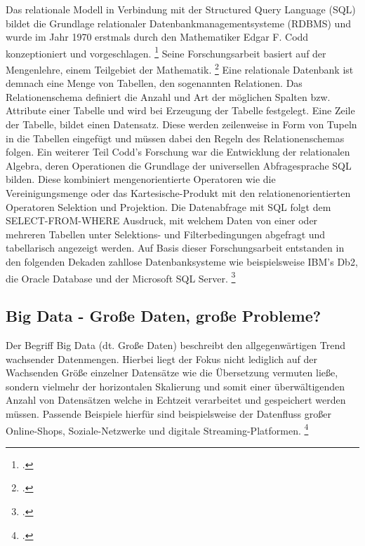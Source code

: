 Das relationale Modell in Verbindung mit der Structured Query Language (SQL)  bildet die Grundlage relationaler Datenbankmanagementsysteme (RDBMS) und wurde im Jahr 1970 erstmals durch den Mathematiker Edgar F. Codd konzeptioniert und vorgeschlagen. \footcite{coddRelationalModelData1970} Seine Forschungsarbeit basiert auf der Mengenlehre, einem Teilgebiet der Mathematik. \footcite[S. 66]{langerDevelopingPathData2023} Eine relationale Datenbank ist demnach eine Menge von Tabellen, den sogenannten Relationen. Das Relationenschema definiert die Anzahl und Art der möglichen Spalten bzw. Attribute einer Tabelle und wird bei Erzeugung der Tabelle festgelegt. Eine Zeile der Tabelle, bildet einen Datensatz. Diese werden zeilenweise in Form von Tupeln in die Tabellen eingefügt und müssen dabei den Regeln des Relationenschemas folgen. Ein weiterer Teil Codd's Forschung war die Entwicklung der relationalen Algebra, deren Operationen die Grundlage der universellen Abfragesprache SQL bilden. Diese kombiniert mengenorientierte Operatoren wie die Vereinigungsmenge oder das Kartesische-Produkt mit den relationenorientierten Operatoren Selektion und Projektion. Die Datenabfrage mit SQL folgt dem SELECT-FROM-WHERE Ausdruck, mit welchem Daten von einer oder mehreren Tabellen unter Selektions- und Filterbedingungen abgefragt und tabellarisch angezeigt werden. Auf Basis dieser Forschungsarbeit entstanden in den folgenden Dekaden zahllose Datenbanksysteme wie beispielsweise IBM's Db2, die Oracle Database und der Microsoft SQL Server. \footcite[S. 15-24]{meierWerkzeugeDigitalenWirtschaft2018}


\subsection{Big Data - Große Daten, große Probleme?}

Der Begriff Big Data (dt. Große Daten) beschreibt den allgegenwärtigen Trend wachsender Datenmengen. Hierbei liegt der Fokus nicht lediglich auf der Wachsenden Größe einzelner Datensätze wie die Übersetzung vermuten ließe, sondern vielmehr der horizontalen Skalierung und somit einer überwältigenden Anzahl von Datensätzen welche in Echtzeit verarbeitet und gespeichert werden müssen. Passende Beispiele hierfür sind beispielsweise der Datenfluss großer Online-Shops, Soziale-Netzwerke und digitale Streaming-Platformen. \footcite[S. 5]{meierWerkzeugeDigitalenWirtschaft2018}